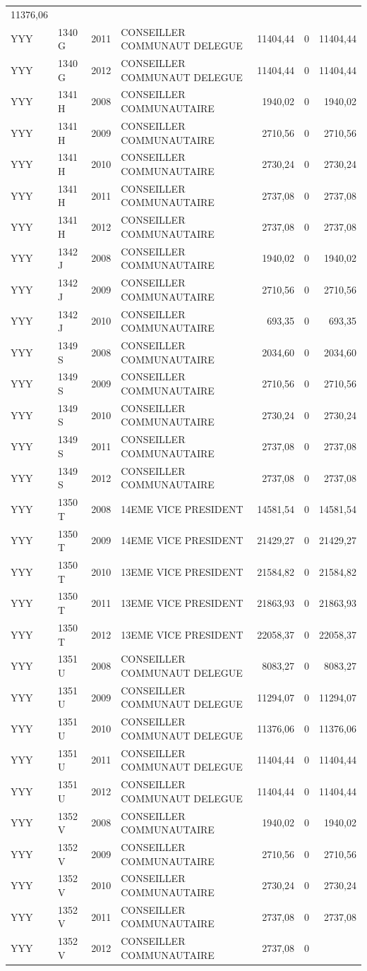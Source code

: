 \begin{longtable}[]{@{}llrlrrr@{}}
11376,06\tabularnewline
YYY & 1340 G & 2011 & CONSEILLER COMMUNAUT DELEGUE & 11404,44 & 0 &
11404,44\tabularnewline
YYY & 1340 G & 2012 & CONSEILLER COMMUNAUT DELEGUE & 11404,44 & 0 &
11404,44\tabularnewline
YYY & 1341 H & 2008 & CONSEILLER COMMUNAUTAIRE & 1940,02 & 0 &
1940,02\tabularnewline
YYY & 1341 H & 2009 & CONSEILLER COMMUNAUTAIRE & 2710,56 & 0 &
2710,56\tabularnewline
YYY & 1341 H & 2010 & CONSEILLER COMMUNAUTAIRE & 2730,24 & 0 &
2730,24\tabularnewline
YYY & 1341 H & 2011 & CONSEILLER COMMUNAUTAIRE & 2737,08 & 0 &
2737,08\tabularnewline
YYY & 1341 H & 2012 & CONSEILLER COMMUNAUTAIRE & 2737,08 & 0 &
2737,08\tabularnewline
YYY & 1342 J & 2008 & CONSEILLER COMMUNAUTAIRE & 1940,02 & 0 &
1940,02\tabularnewline
YYY & 1342 J & 2009 & CONSEILLER COMMUNAUTAIRE & 2710,56 & 0 &
2710,56\tabularnewline
YYY & 1342 J & 2010 & CONSEILLER COMMUNAUTAIRE & 693,35 & 0 &
693,35\tabularnewline
YYY & 1349 S & 2008 & CONSEILLER COMMUNAUTAIRE & 2034,60 & 0 &
2034,60\tabularnewline
YYY & 1349 S & 2009 & CONSEILLER COMMUNAUTAIRE & 2710,56 & 0 &
2710,56\tabularnewline
YYY & 1349 S & 2010 & CONSEILLER COMMUNAUTAIRE & 2730,24 & 0 &
2730,24\tabularnewline
YYY & 1349 S & 2011 & CONSEILLER COMMUNAUTAIRE & 2737,08 & 0 &
2737,08\tabularnewline
YYY & 1349 S & 2012 & CONSEILLER COMMUNAUTAIRE & 2737,08 & 0 &
2737,08\tabularnewline
YYY & 1350 T & 2008 & 14EME VICE PRESIDENT & 14581,54 & 0 &
14581,54\tabularnewline
YYY & 1350 T & 2009 & 14EME VICE PRESIDENT & 21429,27 & 0 &
21429,27\tabularnewline
YYY & 1350 T & 2010 & 13EME VICE PRESIDENT & 21584,82 & 0 &
21584,82\tabularnewline
YYY & 1350 T & 2011 & 13EME VICE PRESIDENT & 21863,93 & 0 &
21863,93\tabularnewline
YYY & 1350 T & 2012 & 13EME VICE PRESIDENT & 22058,37 & 0 &
22058,37\tabularnewline
YYY & 1351 U & 2008 & CONSEILLER COMMUNAUT DELEGUE & 8083,27 & 0 &
8083,27\tabularnewline
YYY & 1351 U & 2009 & CONSEILLER COMMUNAUT DELEGUE & 11294,07 & 0 &
11294,07\tabularnewline
YYY & 1351 U & 2010 & CONSEILLER COMMUNAUT DELEGUE & 11376,06 & 0 &
11376,06\tabularnewline
YYY & 1351 U & 2011 & CONSEILLER COMMUNAUT DELEGUE & 11404,44 & 0 &
11404,44\tabularnewline
YYY & 1351 U & 2012 & CONSEILLER COMMUNAUT DELEGUE & 11404,44 & 0 &
11404,44\tabularnewline
YYY & 1352 V & 2008 & CONSEILLER COMMUNAUTAIRE & 1940,02 & 0 &
1940,02\tabularnewline
YYY & 1352 V & 2009 & CONSEILLER COMMUNAUTAIRE & 2710,56 & 0 &
2710,56\tabularnewline
YYY & 1352 V & 2010 & CONSEILLER COMMUNAUTAIRE & 2730,24 & 0 &
2730,24\tabularnewline
YYY & 1352 V & 2011 & CONSEILLER COMMUNAUTAIRE & 2737,08 & 0 &
2737,08\tabularnewline
YYY & 1352 V & 2012 & CONSEILLER COMMUNAUTAIRE & 2737,08 & 0 &

\end{longtable}
